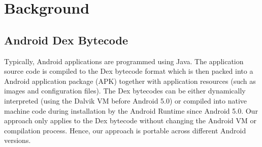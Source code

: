 \section{Background}

\subsection{Android Dex Bytecode}
Typically, Android applications are programmed using Java. The application source code is compiled to the Dex bytecode format which is then packed into a Android application package (APK) together with application resources (such as images and configuration files). 
The Dex bytecodes can be either dynamically interpreted (using the Dalvik VM before Android 5.0) or compiled into native machine code during installation by the Android Runtime since Android 5.0. Our approach only applies to the Dex bytecode without changing the Android VM or compilation process. Hence, our approach is portable across different Android versions. 






